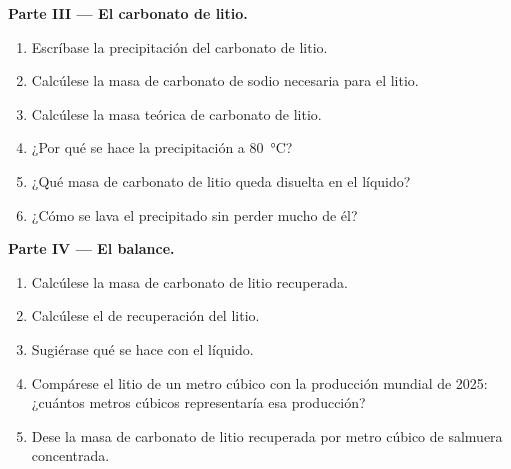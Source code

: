 \begin{problem}
\medskip
\noindent\textbf{Parte III --- El carbonato de litio.}
\begin{enumerate}[resume]
  \item Escríbase la precipitación del carbonato de litio.
  \item Calcúlese la masa de carbonato de sodio necesaria para el litio.
  \item Calcúlese la masa teórica de carbonato de litio.
  \item ¿Por qué se hace la precipitación a \qty{80}{\celsius}?
  \item ¿Qué masa de carbonato de litio queda disuelta en el líquido?
  \item ¿Cómo se lava el precipitado sin perder mucho de él?
\end{enumerate}

\medskip
\noindent\textbf{Parte IV --- El balance.}
\begin{enumerate}[resume]
  \item Calcúlese la masa de carbonato de litio recuperada.
  \item Calcúlese el  de recuperación del litio.
  \item Sugiérase qué se hace con el líquido.
  \item Compárese el litio de un metro cúbico con la producción mundial de
        2025: ¿cuántos metros cúbicos representaría esa producción?
  \item Dese la masa de carbonato de litio recuperada por metro cúbico de
        salmuera concentrada.
\end{enumerate}
\end{problem}
